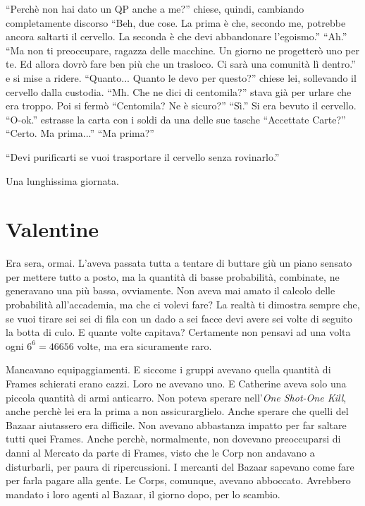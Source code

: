     ``Perchè non hai dato un QP anche a me?'' chiese, quindi, cambiando completamente discorso ``Beh, due cose. La prima
    è che, secondo me, potrebbe ancora saltarti il cervello. La seconda è che devi abbandonare l'egoismo.'' ``Ah.'' ``Ma
    non ti preoccupare, ragazza delle macchine. Un giorno ne progetterò uno per te. Ed allora dovrò fare ben più che un
    trasloco. Ci sarà una comunità lì dentro.'' e si mise a ridere. ``Quanto... Quanto le devo per questo?'' chiese lei,
    sollevando il cervello dalla custodia. ``Mh. Che ne dici di centomila?'' stava già per urlare che era troppo. Poi si
    fermò ``Centomila? Ne è sicuro?'' ``Sì.'' Si era bevuto il cervello. ``O-ok.''  estrasse la carta con i soldi da una
    delle sue tasche ``Accettate Carte?'' ``Certo. Ma prima...'' ``Ma prima?''

    ``Devi purificarti se vuoi trasportare il cervello senza rovinarlo.''

    Una lunghissima giornata.

  \section*{Valentine}

    Era sera, ormai. L'aveva passata tutta a tentare di buttare giù un piano sensato per mettere tutto a posto, ma la
    quantità di basse probabilità, combinate, ne generavano una più bassa, ovviamente. Non aveva mai amato il calcolo
    delle probabilità all'accademia, ma che ci volevi fare? La realtà ti dimostra sempre che, se vuoi tirare sei sei di
    fila con un dado a sei facce devi avere sei volte di seguito la botta di culo. E quante volte capitava? Certamente
    non pensavi ad una volta ogni $6^6 = 46656$ volte, ma era sicuramente raro.

    Mancavano equipaggiamenti. E siccome i gruppi avevano quella quantità di Frames schierati erano cazzi. Loro ne
    avevano uno. E Catherine aveva solo una piccola quantità di armi anticarro. Non poteva sperare nell'\emph{One
    Shot-One Kill}, anche perchè lei era la prima a non assicurarglielo. Anche sperare che quelli del Bazaar aiutassero
    era difficile. Non avevano abbastanza impatto per far saltare tutti quei Frames. Anche perchè, normalmente, non
    dovevano preoccuparsi di danni al Mercato da parte di Frames, visto che le Corp non andavano a disturbarli, per paura
    di ripercussioni. I mercanti del Bazaar sapevano come fare per farla pagare alla gente. Le Corps, comunque, avevano
    abboccato. Avrebbero mandato i loro agenti al Bazaar, il giorno dopo, per lo scambio.


